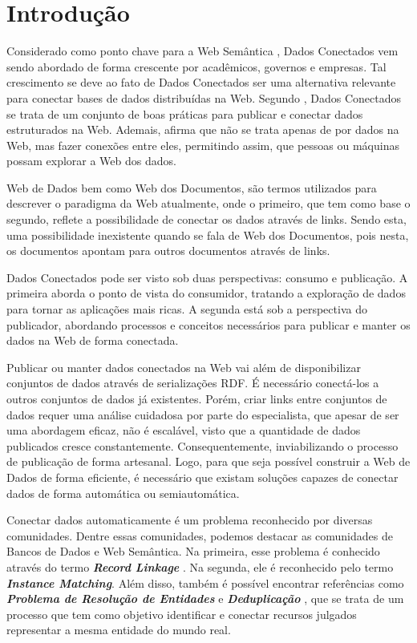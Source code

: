 \chapter{Introdução}
\label{cap:introducao}
Considerado como ponto chave para a Web Semântica \cite{berners2001semantic}, Dados Conectados vem sendo abordado de forma crescente por acadêmicos, governos e empresas. Tal crescimento se deve ao fato de Dados Conectados ser uma alternativa relevante para conectar bases de dados distribuídas na Web. Segundo , Dados Conectados se trata de um conjunto de boas práticas para publicar e conectar dados estruturados na Web. Ademais,  afirma que não se trata apenas de por dados na Web, mas fazer conexões entre eles, permitindo assim, que pessoas ou máquinas possam explorar a Web dos dados.

Web de Dados bem como Web dos Documentos, são termos utilizados para descrever o paradigma da Web atualmente, onde o primeiro, que tem como base o segundo, reflete a possibilidade de conectar os dados através de links. Sendo esta, uma possibilidade inexistente quando se fala de Web dos Documentos, pois nesta, os documentos apontam para outros documentos através de links.

Dados Conectados pode ser visto sob duas perspectivas: consumo e publicação. A primeira aborda o ponto de vista do consumidor, tratando a exploração de dados para tornar as aplicações mais ricas. A segunda está sob a perspectiva do publicador, abordando processos \cite{bizer2007publish, hyland2011joy, villazon2011methodological, Avila2015} e conceitos \cite{berners2006linked, wood2014linked} necessários para publicar e manter os dados na Web de forma conectada. 

Publicar ou manter dados conectados na Web vai além de disponibilizar conjuntos de dados através de serializações RDF. É necessário conectá-los a outros conjuntos de dados já existentes. Porém, criar links entre conjuntos de dados requer uma análise cuidadosa por parte do especialista, que apesar de ser uma abordagem eficaz, não é escalável, visto que a quantidade de dados publicados cresce constantemente. Consequentemente, inviabilizando o processo de publicação de forma artesanal. Logo, para que seja possível construir a Web de Dados de forma eficiente, é necessário que existam soluções capazes de conectar dados de forma automática ou semiautomática.

Conectar dados automaticamente é um problema reconhecido por diversas comunidades. Dentre essas comunidades, podemos destacar as comunidades de Bancos de Dados e Web Semântica. Na primeira, esse problema é conhecido através do termo \textbf{\textit{Record Linkage}} \cite{gu2003record}. Na segunda, ele é reconhecido pelo termo \textbf{\textit{Instance Matching}}. Além disso, também é possível encontrar referências como \textbf{\textit{Problema de Resolução de Entidades}} \cite{menestrina2005generic} e \textbf{\textit{Deduplicação}} \cite{sarawagi2002interactive}, que se trata de um processo que tem como objetivo identificar e conectar recursos julgados representar a mesma entidade do mundo real.

